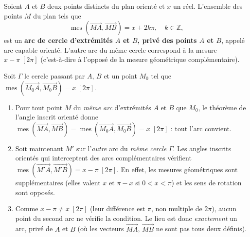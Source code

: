 \documentclass[11pt]{article}
\newcommand{\cle}[1]{{\popxbold\color{popdark}#1}}
\begin{document}
\begin{propriete}
Soient $A$ et $B$ deux points distincts du plan orienté et $x$ un réel. L'ensemble des points $M$ du plan tels que
\[ \operatorname{mes}\left(\overrightarrow{MA}, \overrightarrow{MB}\right) = x + 2k\pi, \quad k \in \mathbb{Z}, \]
est un \textbf{arc de cercle d'extrémités $A$ et $B$, privé des points $A$ et $B$}, appelé \cle{arc capable orienté}. L'autre arc du même cercle correspond à la mesure $x - \pi \;[2\pi]$ (c'est-à-dire à l'opposé de la mesure géométrique complémentaire).
\end{propriete}

\begin{experience}
Soit $\Gamma$ le cercle passant par $A$, $B$ et un point $M_0$ tel que $\operatorname{mes}(\overrightarrow{M_0A}, \overrightarrow{M_0B}) = x \;[2\pi]$.
\begin{enumerate}
\item Pour tout point $M$ du \emph{même arc} d'extrémités $A$ et $B$ que $M_0$, le théorème de l'angle inscrit orienté donne $\operatorname{mes}(\overrightarrow{MA}, \overrightarrow{MB}) = \operatorname{mes}(\overrightarrow{M_0A}, \overrightarrow{M_0B}) = x \;[2\pi]$ : tout l'arc convient.
\item Soit maintenant $M'$ sur l'\emph{autre} arc du \emph{même cercle} $\Gamma$. Les angles inscrits orientés qui interceptent des arcs complémentaires vérifient $\operatorname{mes}(\overrightarrow{M'A}, \overrightarrow{M'B}) = x - \pi \;[2\pi]$. En effet, les mesures géométriques sont supplémentaires (elles valent $x$ et $\pi - x$ si $0 < x < \pi$) et les sens de rotation sont opposés.
\item Comme $x - \pi \neq x \;[2\pi]$ (leur différence est $\pi$, non multiple de $2\pi$), aucun point du second arc ne vérifie la condition. Le lieu est donc \emph{exactement} un arc, privé de $A$ et $B$ (où les vecteurs $\overrightarrow{MA}$, $\overrightarrow{MB}$ ne sont pas tous deux définis).
\end{enumerate}
\end{experience}
\end{document}
